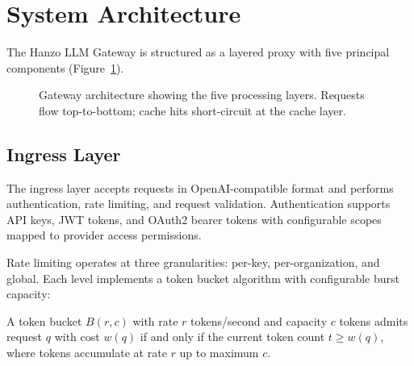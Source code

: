 \section{System Architecture}

\label{sec:architecture}

The Hanzo LLM Gateway is structured as a layered proxy with five principal components (Figure~\ref{fig:architecture}).

\begin{figure}[t]
\centering
{}
\caption{Gateway architecture showing the five processing layers. Requests flow top-to-bottom; cache hits short-circuit at the cache layer.}
\label{fig:architecture}
\end{figure}

\subsection{Ingress Layer}

The ingress layer accepts requests in OpenAI-compatible format and performs authentication, rate limiting, and request validation. Authentication supports API keys, JWT tokens, and OAuth2 bearer tokens with configurable scopes mapped to provider access permissions.

Rate limiting operates at three granularities: per-key, per-organization, and global. Each level implements a token bucket algorithm with configurable burst capacity:

\begin{definition}
A token bucket $B(r, c)$ with rate $r$ tokens/second and capacity $c$ tokens admits request $q$ with cost $w(q)$ if and only if the current token count $t \geq w(q)$, where tokens accumulate at rate $r$ up to maximum $c$.
\end{definition}

